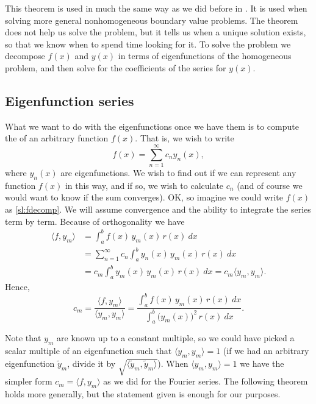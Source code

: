 This theorem is used in much the same way as we did before in
.  It is used when solving more general nonhomogeneous
boundary value problems.  The theorem does not help us solve the problem, but
it tells us when a unique solution exists, so
that we know when to spend time looking for it.  To solve the problem
we decompose $f(x)$ and $y(x)$ in terms of eigenfunctions of the
homogeneous
problem, and then solve for the coefficients of the series for $y(x)$.

\subsection{Eigenfunction series}

What we want to do with the eigenfunctions once we have them is to
compute the \emph{} of an arbitrary
function $f(x)$.  That is, we wish to write
\begin{equation} \label{sl:fdecomp}
f(x) = \sum_{n=1}^\infty c_n y_n(x) ,
\end{equation}
where $y_n(x)$ are eigenfunctions.
We wish to find out if we can represent
any function $f(x)$ in this way,
and if so, we wish to calculate $c_n$ (and of course we would want to know if
the sum converges).  OK\@, so imagine
we could write $f(x)$ as \eqref{sl:fdecomp}.  We will assume convergence and
the ability to integrate the series term by term.
Because of orthogonality we have
\begin{equation*}
\begin{split}
\langle f , y_m \rangle & =
\int_a^b f(x) \, y_m (x) \, r(x) ~ dx\\
&= \sum_{n=1}^\infty c_n \int_a^b y_n(x) \, y_m (x) \, r(x) ~ dx\\
&= c_m \int_a^b y_m(x) \, y_m (x) \, r(x) ~ dx = c_m \langle y_m , y_m \rangle
.
\end{split}
\end{equation*}
Hence,
\begin{equation} \label{sl:cm}
\boxed{~~
c_m = \frac{\langle f , y_m \rangle}{\langle y_m , y_m \rangle}
=
\frac{\int_a^b f(x) \, y_m (x)\, r(x) ~ dx}%
{\int_a^b {\bigl(y_m(x)\bigr)}^2 \, r(x) ~dx} .
~~}
\end{equation}

Note that $y_m$ are known up to a constant multiple, so we could have picked
a scalar multiple of an eigenfunction such that
$\langle y_m , y_m \rangle = 1$ (if we had an arbitrary eigenfunction
$\tilde{y}_m$, divide it
by $\sqrt{\langle \tilde{y}_m , \tilde{y}_m \rangle}$).
When
$\langle y_m , y_m \rangle = 1$
we have the
simpler form $c_m = \langle f, y_m \rangle$ as we did for the
Fourier series.  The following theorem holds
more generally, but the statement given is enough for our purposes.

